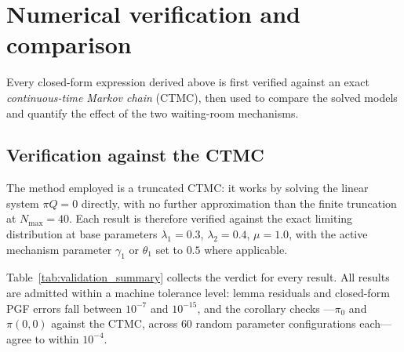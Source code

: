 \section{Numerical verification and comparison}\label{sec:results}

Every closed-form expression derived above is first verified against an exact \emph{continuous-time Markov chain} (CTMC), then used to compare the solved models and quantify the effect of the two waiting-room mechanisms.

\subsection{Verification against the CTMC}\label{subsec:validation}

The method employed is a truncated CTMC: it works by solving the linear system $\pi Q=0$ directly, with no further approximation than the finite truncation at $N_{\max}=40$. Each result is therefore verified against the exact limiting distribution at base parameters $\lambda_1=0.3$, $\lambda_2=0.4$, $\mu=1.0$, with the active mechanism parameter $\gamma_1$ or $\theta_1$ set to $0.5$ where applicable.

Table~\ref{tab:validation_summary} collects the verdict for every result. All results are admitted within a machine tolerance level: lemma residuals and closed-form PGF errors fall between $10^{-7}$ and $10^{-15}$, and the corollary checks ---$\pi_0$ and $\pi(0,0)$ against the CTMC, across $60$ random parameter configurations each--- agree to within $10^{-4}$.

